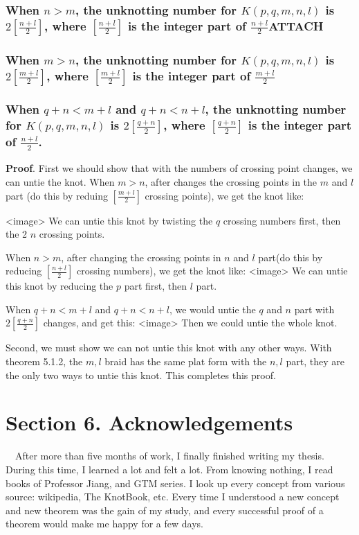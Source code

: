 \documentclass[lang=cn]{elegantpaper}
\begin{document}
\subsubsection{When \(n>m\), the unknotting number for \(K(p, q, m, n, l)\) is \(2[\frac{n+l}{2}]\), where \([\frac{n+l}{2}]\) is the integer part of \(\frac{n+l}{2}\)\hfill{}\textsc{ATTACH}}
\label{sec:org73e7558}

\subsubsection{When \(m>n\), the unknotting number for \(K(p, q, m, n, l)\) is \(2[\frac{m+l}{2}]\), where \([\frac{m +l}{2}]\) is the integer part of \(\frac{m +l}{2}\)}
\label{sec:org9fed131}
\subsubsection{When \(q + n < m + l\) and \(q + n < n + l\), the unknotting number for \(K(p, q, m, n, l)\) is \(2[\frac{q+n}{2}]\), where \([\frac{q+n}{2}]\) is the integer part of \(\frac{n+l}{2}\).}
\label{sec:org997889b}

\textbf{Proof}. First we should show that with the numbers of crossing point changes, we can untie the knot.
When \(m>n\), after changes the crossing points in the \(m\) and \(l\) part (do this by reduing \([\frac{m+l}{2}]\) crossing points), we get the knot like:

<image>
We can untie this knot by twisting the \(q\) crossing numbers first, then the 2 \(n\) crossing points.

When \(n>m\), after changing the crossing points in \(n\) and \(l\) part(do this by reducing \([\frac{n+l}{2}]\) crossing numbers), we get the knot like:
<image>
We can untie this knot by reducing the \(p\) part first, then \(l\) part.

When \(q + n < m + l\) and \(q + n < n + l\), we would untie the \(q\) and \(n\) part with \(2[\frac{q+n}{2}]\) changes, and get this:
<image>
Then we could untie the whole knot.

Second, we must show we can not untie this knot with any other ways.
With theorem 5.1.2, the \(m , l\) braid has the same plat form with the \(n, l\) part, they are the only two ways to untie this knot. This completes this proof.

\section{Section 6. Acknowledgements}
\label{sec:orga9959b7}
　After more than five months of  work, I finally finished writing my thesis. During this time, I learned a lot and felt a lot. From knowing nothing, I read books of Professor Jiang, and GTM series. I look up every concept from various source: wikipedia, The KnotBook, etc. Every time I understood a new concept and new theorem was the gain of my study, and every successful proof of a theorem would make me happy for a few days.
\end{document}
